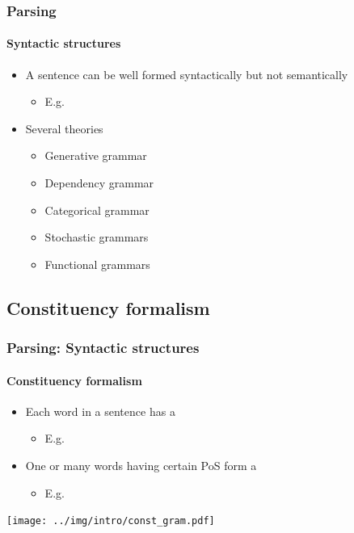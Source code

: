 \documentclass[xcolor=table]{beamer}
\begin{document}
\begin{frame}
\frametitle{Parsing}
\framesubtitle{Syntactic structures}

\begin{itemize}
	\item A sentence can be well formed syntactically but not semantically
	\begin{itemize}
		\item E.g. 
	\end{itemize}
	\item Several theories
	\begin{itemize}
		\item Generative grammar
		\item Dependency grammar
		\item Categorical grammar
		\item Stochastic grammars
		\item Functional grammars
	\end{itemize}
	
\end{itemize}

\end{frame}

\subsection{Constituency formalism}

\begin{frame}
\frametitle{Parsing: Syntactic structures}
\framesubtitle{Constituency formalism}

\begin{itemize}
	\item Each word in a sentence has a 
	\begin{itemize}
		\item E.g. 
	\end{itemize}
	\item One or many words having certain PoS form a 
	\begin{itemize}
		\item E.g. 
	\end{itemize}
\end{itemize}

\begin{center}
	\texttt{[image: ../img/intro/const\_gram.pdf]}
\end{center}

\end{frame}
\end{document}
